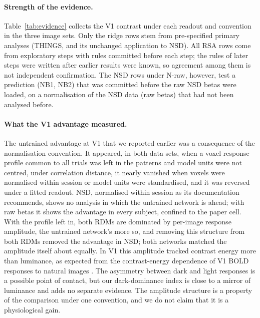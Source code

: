 \paragraph{Strength of the evidence.}
Table~\ref{tab:evidence} collects the V1 contrast under each readout and convention in the three image
sets. Only the ridge rows stem from pre-specified primary analyses (THINGS, and its unchanged application
to NSD). All RSA rows come from exploratory steps with rules committed before each step; the rules of
later steps were written after earlier results were known, so agreement among them is not independent
confirmation. The NSD rows under N-raw, however, test a prediction (NB1, NB2) that was committed before
the raw NSD betas were loaded, on a normalisation of the NSD data (raw betas) that had not been analysed before.



\paragraph{What the V1 advantage measured.}
The untrained advantage at V1 that we reported earlier \citep{evalres} was a consequence of the
normalisation convention. It appeared, in both data sets, when a voxel response profile common to all
trials was left in the patterns and model units were not centred, under correlation distance, it nearly
vanished when voxels were normalised within session or model units were standardised, and it was reversed
under a fitted readout. NSD, normalised within session as its documentation recommends, shows no analysis in which
the untrained network is ahead; with raw betas it shows the advantage in every subject, confined to the
paper cell. With the profile left in, both RDMs are dominated by per-image response amplitude, the
untrained network's more so, and removing this structure from both RDMs removed the advantage in NSD;
both networks matched the amplitude itself about equally. In V1 this amplitude tracked contrast energy
more than luminance, as expected from the contrast-energy dependence of V1 BOLD responses to natural
images \citep{kay2013}. The asymmetry between dark and light responses \citep{kremkow2014} is a possible
point of contact, but our dark-dominance index is close to a mirror of luminance and adds no separate
evidence. The amplitude structure is a property of the comparison under one convention, and we do not
claim that it is a physiological gain.

